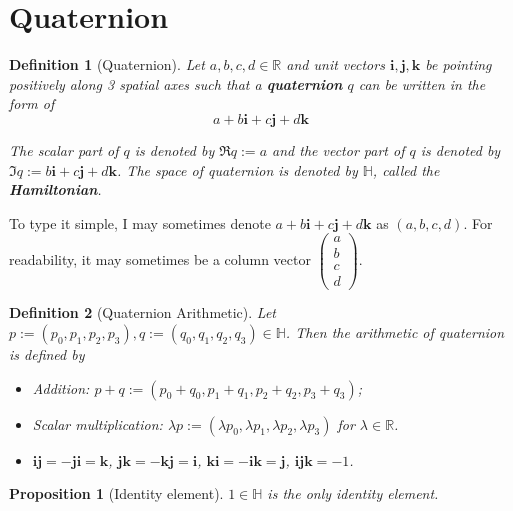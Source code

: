 \documentclass[12pt]{article}
\newtheorem*{definition}{Definition}
\newtheorem*{proposition}{Proposition}
\begin{document}
    \section{Quaternion}

    \begin{definition}[Quaternion]
        Let $a,b,c,d\in\mathbb{R}$ and unit vectors $\mathbf{i},\mathbf{j},\mathbf{k}$ be pointing positively along 3 spatial axes such that a \textbf{quaternion} $q$ can be written in the form of $$a+b\mathbf{i}+c\mathbf{j}+d\mathbf{k}$$

        The scalar part of $q$ is denoted by $\Re{q}:=a$ and the vector part of $q$ is denoted by $\Im{q}:=b\mathbf{i}+c\mathbf{j}+d\mathbf{k}$. The space of quaternion is denoted by $\mathbb{H}$, called the \textbf{Hamiltonian}.
    \end{definition}

    To type it simple, I may sometimes denote $a+b\mathbf{i}+c\mathbf{j}+d\mathbf{k}$ as $(a,b,c,d)$. For readability, it may sometimes be a column vector $\begin{pmatrix}
        a\\b\\c\\d
    \end{pmatrix}$.

    \begin{definition}[Quaternion Arithmetic]
        Let $p:=(p_0,p_1,p_2,p_3),q:=(q_0,q_1,q_2,q_3)\in\mathbb{H}$. Then the arithmetic of quaternion is defined by\begin{itemize}
            \item Addition: $p+q:=(p_0+q_0,p_1+q_1,p_2+q_2,p_3+q_3)$;
            \item Scalar multiplication: $\lambda p:=(\lambda p_0,\lambda p_1, \lambda p_2, \lambda p_3)$ for $\lambda\in\mathbb{R}$.
            \item $\mathbf{i}\mathbf{j}=-\mathbf{j}\mathbf{i}=\mathbf{k}$, $\mathbf{j}\mathbf{k}=-\mathbf{k}\mathbf{j}=\mathbf{i}$, $\mathbf{k}\mathbf{i}=-\mathbf{i}\mathbf{k}=\mathbf{j}$, $\mathbf{i}\mathbf{j}\mathbf{k}=-1$.
        \end{itemize}
    \end{definition}

    \begin{proposition}[Identity element]
        $1\in\mathbb{H}$ is the only identity element.
    \end{proposition}
\end{document}

